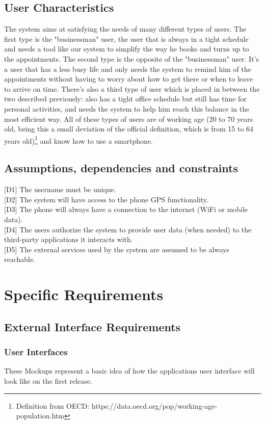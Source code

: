 \documentclass[12pt]{article}
\begin{document}
\subsection{User Characteristics}
The system aims at satisfying the needs of many different types of users. The first type is the "businessman" user, the user that is always in a tight schedule and needs a tool like our system to simplify the way he books and turns up to the appointments. The second type is the opposite of the "businessman" user. It's a user that has a less busy life and only needs the system to remind him of the appointments without having to worry about how to get there or when to leave to arrive on time. There's also a third type of user which is placed in between the two described previously: also has a tight office schedule but still has time for personal activities, and needs the system to help him reach this balance in the most efficient way.
All of these types of users are of working age (20 to 70 years old, being this a small deviation of the official definition, which is from 15 to 64 years old)\footnote{Definition from OECD: https://data.oecd.org/pop/working-age-population.htm} and know how to use a smartphone.

\subsection{Assumptions, dependencies and constraints}
[D1] The username must be unique.\\{}
[D2] The system will have access to the phone GPS functionality.\\{}
[D3] The phone will always have a connection to the internet (WiFi or mobile data).\\{}
[D4] The users authorize the system to provide user data (when needed) to the third-party applications it interacts with.\\{}
[D5] The external services used by the system are assumed to be always reachable.\\{}


\section{Specific Requirements}

\subsection{External Interface Requirements}

\subsubsection{User Interfaces}
These Mockups represent a basic idea of how the applications user interface will look like on the first release.
\end{document}
